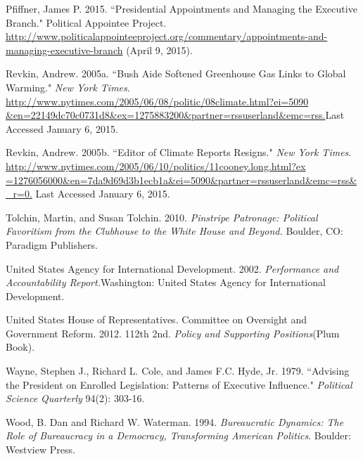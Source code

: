\documentclass[12pt]{article}
\begin{document}
\noindent \hangindent=0.7cm Pfiffner, James P. 2015. ``Presidential Appointments and Managing the Executive Branch." Political Appointee Project. \url{http://www.politicalappointeeproject.org/commentary/appointments-and-managing-executive-branch} (April 9, 2015).

\noindent \hangindent=0.7cm Revkin, Andrew. 2005a. ``Bush Aide Softened Greenhouse Gas Links to Global Warming." \textit{New York Times}. \url{http://www.nytimes.com/2005/06/08/politic/08climate.html?ei=5090 &en=22149dc70c0731d8&ex=1275883200&partner=rssuserland&emc=rss.}Last Accessed January 6, 2015.

\noindent \hangindent=0.7cm Revkin, Andrew. 2005b. ``Editor of Climate Reports Resigns." \textit{New York Times}. \url{http://www.nytimes.com/2005/06/10/politics/11cooney.long.html?ex =1276056000&en=7da9d69d3b1ecb1a&ei=5090&partner=rssuserland&emc=rss&_r=0.} Last Accessed January 6, 2015. 

\noindent \hangindent=0.7cm Tolchin, Martin, and Susan Tolchin. 2010. \textit{Pinstripe Patronage: Political Favoritism from the Clubhouse to the White House and Beyond.} Boulder, CO: Paradigm Publishers.

\noindent \hangindent=0.7cm United States Agency for International Development. 2002. \textit{Performance and Accountability Report.}Washington: United States Agency for International Development.

\noindent \hangindent=0.7cm United States House of Representatives. Committee on Oversight and Government Reform. 2012. 112th 2nd. \textit{Policy and Supporting Positions}(Plum Book). 

\noindent \hangindent=0.7cm Wayne, Stephen J., Richard L. Cole, and James F.C. Hyde, Jr. 1979. ``Advising the President on Enrolled Legislation: Patterns of Executive Influence." \textit{Political Science Quarterly} 94(2): 303-16. 

\noindent \hangindent=0.7cm Wood, B. Dan and Richard W. Waterman. 1994. \textit{Bureaucratic Dynamics: The Role of Bureaucracy in a Democracy, Transforming American Politics}. Boulder: Westview Press. 
\end{document}
